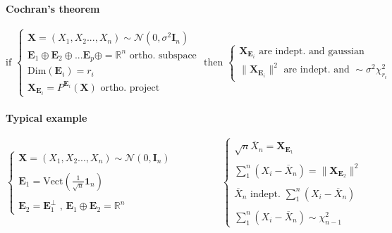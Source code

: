 \documentclass[a4paper,10pt]{article}
\begin{document}
\paragraph{Cochran's theorem}
\[
\text{if }
\left\{
\begin{array}{l}
\textbf{X} = (X_1,X_2 ...,X_n) \sim \mathcal{N}(0, \sigma^2 \textbf{I}_n) \\
\textbf{E}_1\oplus\textbf{E}_2\oplus ... \textbf{E}_p\oplus = \mathbb{R}^n \text{ ortho. subspace} \\
\text{Dim}(\textbf{E}_i) = r_i   \\
\textbf{X}_{\textbf{E}_i} = P^{\textbf{E}_i}(\textbf{X}) \text{ ortho. project} 
\end{array}\right.
\text{ then }
\left\{
\begin{array}{l}
\textbf{X}_{\textbf{E}_i} \text{ are indept. and gaussian} \\
 \| \textbf{X}_{\textbf{E}_i} \|^{2} \text{ are indept. and } \sim \sigma^2\chi^2_{r_i}
\end{array}\right.
\]

\paragraph{Typical example}
\[
\left\{
\begin{array}{l}
\textbf{X} = (X_1,X_2 ...,X_n) \sim \mathcal{N}(0, \textbf{I}_n) \\ \\
\textbf{E}_1 = \text{Vect}(\frac{1}{\sqrt{n}} \mathbf{1}_n) \\ \\
\textbf{E}_2 = \textbf{E}_1^{\bot} \text{ , } \textbf{E}_1\oplus\textbf{E}_2= \mathbb{R}^n
\end{array}\right.
\hspace{2cm}
\left\{
\begin{array}{l}
 \sqrt{n} \overline{X}_n =  \textbf{X}_{\textbf{E}_1}\\ \\
 \sum^n_1 (X_i- \overline{X}_n) = \| \textbf{X}_{\textbf{E}_2} \|^{2} \\ \\
\overline{X}_n \text{ indept. } \sum^n_1 (X_i- \overline{X}_n) \\ \\
\sum^n_1 (X_i- \overline{X}_n) \sim \chi^2_{n-1}
\end{array}\right. 
\]
\end{document}
